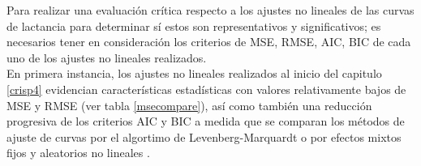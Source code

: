 \begin{table}[H]
\centering
\caption{Comparación de error cuadrático medio MSE para cada método de ajuste no lineal.}
\label{msecompare}
\end{table}
\pagebreak

Para realizar una evaluación crítica respecto a los ajustes no lineales de las curvas de lactancia para determinar sí estos son representativos y significativos; es necesarios tener en consideración los criterios de MSE, RMSE, AIC, BIC de cada uno de los ajustes no lineales realizados. \\

En primera instancia, los ajustes no lineales realizados al inicio del capitulo \ref{crisp4} evidencian características estadísticas con valores relativamente bajos de MSE y RMSE (ver tabla \ref{msecompare}), así como también una reducción progresiva de los criterios AIC y BIC a medida que se comparan los métodos de ajuste de curvas por el algortimo de Levenberg-Marquardt o por efectos mixtos fijos y aleatorios no lineales  .\\

